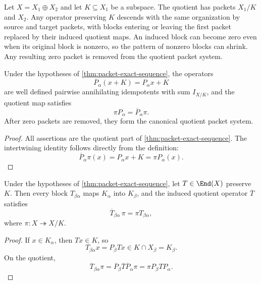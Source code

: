 \begin{microexample}[title={Packet descent to a quotient}]
Let \(X=X_1\oplus X_2\) and let \(K\subseteq X_1\) be a subspace.  The quotient has packets \(X_1/K\) and \(X_2\).  Any operator preserving \(K\) descends with the same organization by source and target packets, with blocks entering or leaving the first packet replaced by their induced quotient maps.  An induced block can become zero even when its original block is nonzero, so the pattern of nonzero blocks can shrink.  Any resulting zero packet is removed from the quotient packet system.
\end{microexample}


\begin{theorem}
\label{thm:quotient-packet-descent}
Under the hypotheses of \cref{thm:packet-exact-sequence}, the operators
\[
\overline P_\alpha(x+K)=P_\alpha x+K
\]
are well defined pairwise annihilating idempotents with sum $I_{X/K}$, and the quotient map satisfies
\[
\boxed{\pi P_\alpha=\overline P_\alpha\pi.}
\]
After zero packets are removed, they form the canonical quotient packet system.
\end{theorem}

\begin{proof}
All assertions are the quotient part of \cref{thm:packet-exact-sequence}.  The intertwining identity follows directly from the definition:
\[
\overline P_\alpha\pi(x)=P_\alpha x+K=\pi P_\alpha(x).
\]
\end{proof}

\begin{corollary}
\label{cor:block-descent}
Under the hypotheses of \cref{thm:packet-exact-sequence}, let $T\in\End(X)$ preserve $K$.  Then every block $T_{\beta\alpha}$ maps $K_\alpha$ into $K_\beta$, and the induced quotient operator $\overline T$ satisfies
\[
\boxed{
\overline T_{\beta\alpha}\,\pi
=
\pi T_{\beta\alpha},
}
\]
where $\pi:X\twoheadrightarrow X/K$.
\end{corollary}

\begin{proof}
If $x\in K_\alpha$, then $Tx\in K$, so
\[
T_{\beta\alpha}x=P_\beta Tx\in K\cap X_\beta=K_\beta.
\]
On the quotient,
\[
\overline T_{\beta\alpha}\pi
=
\overline P_\beta\overline T\overline P_\alpha\pi
=
\pi P_\beta TP_\alpha.
\]
\end{proof}

